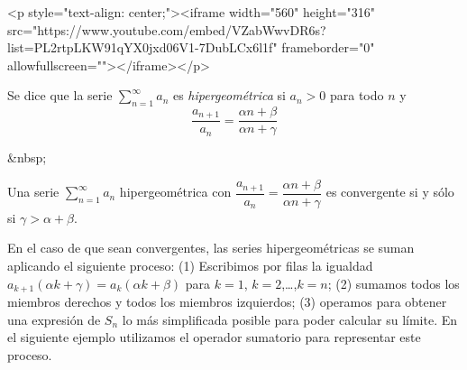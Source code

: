 \begin{rawhtml}
<p style="text-align: center;"><iframe width="560" height="316" src="https://www.youtube.com/embed/VZabWwvDR6s?list=PL2rtpLKW91qYX0jxd06V1-7DubLCx6l1f" frameborder="0" allowfullscreen=""></iframe></p>
\end{rawhtml}
\begin{definicion}
Se dice que la serie $\displaystyle\sum_{n=1}^\infty  a_n$ es \emph{hipergeométrica} si $a_n>0$ para todo $n$ y
\[
\frac{a_{n+1}}{a_n} = \dfrac{\alpha n+\beta}{\alpha n+\gamma}
\]
\end{definicion}
\begin{rawhtml}
&nbsp;
\end{rawhtml}
\begin{teorema} Una serie $\displaystyle\sum_{n=1}^\infty  a_n$ hipergeométrica con $\dfrac{a_{n+1}}{a_n} = \dfrac{\alpha n+\beta}{\alpha n+\gamma}$ es convergente si y sólo si $\gamma>\alpha+\beta$.
\end{teorema}

En el caso de que sean convergentes, las series hipergeométricas se suman aplicando el siguiente proceso:
(1) Escribimos por filas la igualdad $a_{k+1}(\alpha k+\gamma) = a_k(\alpha k+\beta)$ para $k=1$, $k=2$,\dots,$k=n$;
(2) sumamos todos los miembros derechos y todos los miembros izquierdos;
(3) operamos para obtener una expresión de $S_n$ lo más simplificada posible para poder calcular su límite.
En el siguiente ejemplo utilizamos el operador sumatorio para representar este proceso.

